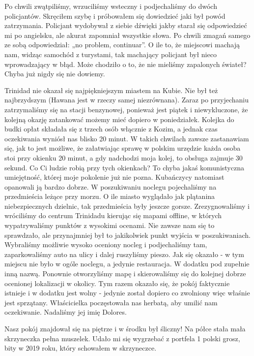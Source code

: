 Po chwili zwątpiliśmy, wrzuciliśmy wsteczny i podjechaliśmy do dwóch policjantów.
Skręciłem szybę i próbowałem się dowiedzieć jaki był powód zatrzymania.
Policjant wydobywał z siebie dźwięki jakby starał się odpowiedzieć mi po angielsku, ale akurat zapomniał wszystkie słowa.
Po chwili zmagań samego ze sobą odpowiedział: „no problem, continuar”.
O ile to, że miejscowi machają nam, widząc samochód z turystami, tak machający policjant był nieco wprowadzający w błąd.
Może chodziło o to, że nie mieliśmy zapalonych świateł?
Chyba już nigdy się nie dowiemy.
\par Trinidad nie okazał się najpiękniejszym miastem na Kubie.
Nie był też najbrzydszym (Hawana jest w rzeczy samej niezrównana).
Zaraz po przyjechaniu zatrzymaliśmy się na stacji benzynowej, ponieważ jest piątek i niewykluczone, że kolejną okazję zatankować możemy mieć dopiero w poniedziałek.
Kolejka do budki opłat składała się z trzech osób włącznie z Kozim, a jednak czas oczekiwania wyniósł nas blisko 20 minut.
W takich chwilach zawsze zastanawiam się, jak to jest możliwe, że załatwiając sprawę w polskim urzędzie każda osoba stoi przy okienku 20 minut, a gdy nadchodzi moja kolej, to obsługa zajmuje 30 sekund.
Co Ci ludzie robią przy tych okienkach?
To chyba jakaś komunistyczna umiejętność, której moje pokolenie już nie pozna.
Kubańczycy natomiast opanowali ją bardzo dobrze.
W poszukiwaniu noclegu pojechaliśmy na przedmieścia leżące przy morzu.
O ile miasto wyglądało jak plątanina niebezpiecznych dzielnic, tak przedmieścia były jeszcze gorsze.
Zrezygnowaliśmy i wróciliśmy do centrum Trinidadu kierując się mapami offline, w których wypatrywaliśmy punktów z wysokimi ocenami. Nie zawsze nam się to sprawdzało, ale przynajmniej był to jakikolwiek punkt wyjścia w poszukiwaniach.
Wybraliśmy możliwie wysoko oceniony nocleg i podjechaliśmy tam, zaparkowaliśmy auto na ulicy i dalej ruszyliśmy pieszo.
Jak się okazało - w tym miejscu nie było w ogóle noclegu, a jedynie restauracja.
W dodatku pod zupełnie inną nazwą.
Ponownie otworzyliśmy mapę i skierowaliśmy się do kolejnej dobrze ocenionej lokalizacji w okolicy.
Tym razem okazało się, że pokój faktycznie istnieje i w dodatku jest wolny - jedynie został dopiero co zwolniony więc właśnie jest sprzątany.
Właścicielka poczęstowała nas herbatą, aby umilić nam oczekiwanie.
Nadaliśmy jej imię Dolores.
\par Nasz pokój znajdował się na piętrze i w środku był śliczny!
Na półce stała mała skrzyneczka pełna muszelek.
Udało mi się wygrzebać z portfela 1 polski grosz, bity w 2019 roku, który schowałem w skrzyneczce.
